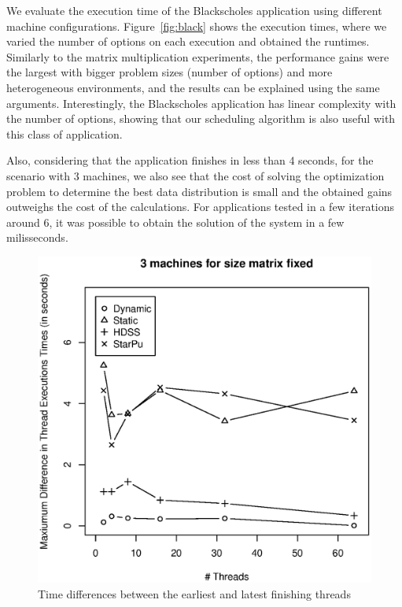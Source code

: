 \documentclass[journal]{IEEEtran}
\begin{document}
We evaluate the execution time of the Blackscholes application using different
machine configurations. Figure~\ref{fig:black} shows the execution times, where
we varied the number of options on each execution and obtained the
runtimes. Similarly to the matrix multiplication experiments, the performance
gains were the largest with bigger problem sizes (number of options) and more
heterogeneous environments, and the results can be explained using the same
arguments. Interestingly, the Blackscholes application has linear complexity
with the number of options, showing that our scheduling algorithm is also useful
with this class of application.


Also, considering that the application finishes in less than 4 seconds, for the
scenario with 3 machines, we also see that the cost of solving the optimization
problem to determine the best data distribution is small and the obtained gains
outweighs the cost of the calculations. For applications tested in a few
iterations around 6, it was possible to obtain the solution of the system in a
few milisseconds.


\begin{figure}[htb]
	\begin{center}
	\centering
			\includegraphics[scale=0.4]{MaximaDiferencaBlack.eps}
	\caption{Time differences between the earliest and latest finishing threads}
	\label{fig:diferencaThreadsBlack}
	\end{center}
\end{figure}
\end{document}
